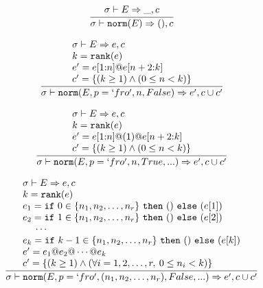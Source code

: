 \documentclass{article}
\begin{document}
\begin{align*}
  \frac
  {
    \begin{array}{l}
      \sigma \vdash E \Rightarrow \_, c
    \end{array}
  }
  {
    \sigma \vdash \mathtt{norm(}E\mathtt{)} \Rightarrow (), c
  }
\end{align*}

\begin{align*}
  \frac
  {
    \begin{array}{l}
      \sigma \vdash E \Rightarrow e, c \\
      k = \mathtt{rank(}e\mathtt{)} \\
      e' = e \mathtt{[}1\mathtt{:}n\mathtt{]} \mathtt{@} e \mathtt{[}n+2\mathtt{:}k\mathtt{]} \\
      c' = \{ (k \geq 1) \land (0 \leq n < k) \}
    \end{array}
  }
  {
    \sigma \vdash \mathtt{norm(}E, p=`fro', n, False\mathtt{)} \Rightarrow e', c \cup c'
  }
\end{align*}

\begin{align*}
  \frac
  {
    \begin{array}{l}
      \sigma \vdash E \Rightarrow e, c \\
      k = \mathtt{rank(}e\mathtt{)} \\
      e' = e \mathtt{[}1\mathtt{:}n\mathtt{]} \mathtt{@} (1) \mathtt{@} e \mathtt{[}n+2\mathtt{:}k\mathtt{]} \\
      c' = \{ (k \geq 1) \land (0 \leq n < k) \}
    \end{array}
  }
  {
    \sigma \vdash \mathtt{norm(}E, p=`fro', n, True, ...\mathtt{)} \Rightarrow e', c \cup c'
  }
\end{align*}

\begin{align*}
  \frac
  {
    \begin{array}{l}
      \sigma \vdash E \Rightarrow e, c \\
      k = \mathtt{rank(}e\mathtt{)} \\
      e_1 = \mathtt{if}\,\,0 \in \{n_1, n_2, \dots, n_r\}\,\,\mathtt{then}\,\,()\,\,\mathtt{else}\,\,(e[1]) \\
      e_2 = \mathtt{if}\,\,1 \in \{n_1, n_2, \dots, n_r\}\,\,\mathtt{then}\,\,()\,\,\mathtt{else}\,\,(e[2]) \\
      \,\,\,\,\,\,\,\, \cdots \\
      e_k = \mathtt{if}\,\,k-1 \in \{n_1, n_2, \dots, n_r\}\,\,\mathtt{then}\,\,()\,\,\mathtt{else}\,\,(e[k]) \\
      e' = e_1 \mathtt{@} e_2 \mathtt{@} \cdots \mathtt{@} e_k \\
      c' = \{ (k \geq 1) \land (\forall i=1, 2, \dots, r,\: 0 \leq n_i < k) \}
    \end{array}
  }
  {
    \sigma \vdash \mathtt{norm(}E, p=`fro', (n_1, n_2, \dots, n_r), False, ...\mathtt{)}
      \Rightarrow e', c \cup c'
  }
\end{align*}
\end{document}

